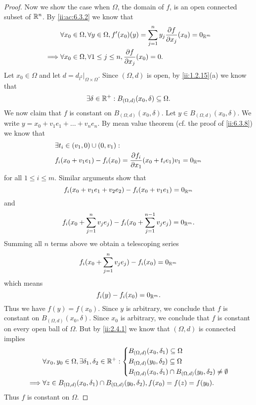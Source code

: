 \begin{proof}
  Now we show the case when \(\Omega\), the domain of \(f\), is an open connected subset of \(\mathbb{R}^n\).
  By \cref{ii:ac:6.3.2} we know that
  \begin{align*}
             & \forall x_0 \in \Omega, \forall y \in \Omega, f'(x_0)(y) = \sum_{j = 1}^n y_j \dfrac{\partial f}{\partial x_j}(x_0) = 0_{\mathbb{R}^m} \\
    \implies & \forall x_0 \in \Omega, \forall 1 \leq j \leq n, \dfrac{\partial f}{\partial x_j}(x_0) = 0.
  \end{align*}
  Let \(x_0 \in \Omega\) and let \(d = d_{l^2}|_{\Omega \times \Omega}\).
  Since \((\Omega, d)\) is open, by \cref{ii:1.2.15}(a) we know that
  \[
    \exists \delta \in \mathbb{R}^+ : B_{(\Omega, d)}(x_0, \delta) \subseteq \Omega.
  \]
  We now claim that \(f\) is constant on \(B_{(\Omega, d)}(x_0, \delta)\).
  Let \(y \in B_{(\Omega, d)}(x_0, \delta)\).
  We write \(y = x_0 + v_1 e_1 + \dots + v_n e_n\).
  By mean value theorem (cf. the proof of \cref{ii:6.3.8}) we know that
  \begin{align*}
     & \exists t_i \in (v_1, 0) \cup (0, v_1) :                                                         \\
     & f_i(x_0 + v_1 e_1) - f_i(x_0) = \dfrac{\partial f_i}{\partial x_1}(x_0 + t_i e_1) v_1 = 0_{\mathbb{R}^m}
  \end{align*}
  for all \(1 \leq i \leq m\).
  Similar arguments show that
  \[
    f_i(x_0 + v_1 e_1 + v_2 e_2) - f_i(x_0 + v_1 e_1) = 0_{\mathbb{R}^m}
  \]
  and
  \[
    f_i(x_0 + \sum_{j = 1}^n v_j e_j) - f_i(x_0 + \sum_{j = 1}^{n - 1} v_j e_j) = 0_{\mathbb{R}^m}.
  \]
  Summing all \(n\) terms above we obtain a telescoping series
  \[
    f_i(x_0 + \sum_{j = 1}^n v_j e_j) - f_i(x_0) = 0_{\mathbb{R}^m}
  \]
  which means
  \[
    f_i(y) - f_i(x_0) = 0_{\mathbb{R}^m}.
  \]
  Thus we have \(f(y) = f(x_0)\).
  Since \(y\) is arbitrary, we conclude that \(f\) is constant on \(B_{(\Omega, d)}(x_0, \delta)\).
  Since \(x_0\) is arbitrary, we conclude that \(f\) is constant on every open ball of \(\Omega\).
  But by \cref{ii:2.4.1} we know that \((\Omega, d)\) is connected implies
  \begin{align*}
             & \forall x_0, y_0 \in \Omega, \exists \delta_1, \delta_2 \in \mathbb{R}^+ : \begin{dcases}
                                                                                    B_{(\Omega, d)}(x_0, \delta_1) \subseteq \Omega \\
                                                                                    B_{(\Omega, d)}(y_0, \delta_2) \subseteq \Omega \\
                                                                                    B_{(\Omega, d)}(x_0, \delta_1) \cap B_{(\Omega, d)}(y_0, \delta_2) \neq \emptyset
                                                                                  \end{dcases} \\
    \implies & \forall z \in B_{(\Omega, d)}(x_0, \delta_1) \cap B_{(\Omega, d)}(y_0, \delta_2), f(x_0) = f(z) = f(y_0).
  \end{align*}
  Thus \(f\) is constant on \(\Omega\).
\end{proof}
